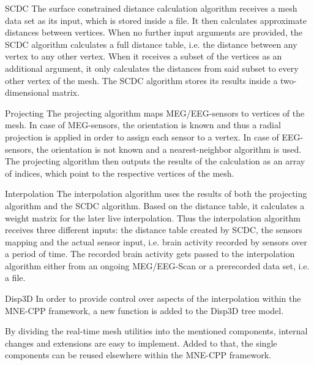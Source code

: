 \begin{aims}
	
	\item[SCDC] 
	The surface constrained distance calculation algorithm receives a mesh data set as its input, which is stored inside a file. It then calculates approximate distances between vertices. When no further input arguments are provided, the SCDC algorithm calculates a full distance table, i.e. the distance between any vertex to any other vertex.
	When it receives a subset of the vertices as an additional argument, it only calculates the distances from said subset to every other vertex of the mesh. The SCDC algorithm stores its results inside a two-dimensional matrix.
	
	\item[Projecting]
	The projecting algorithm maps MEG/EEG-sensors to vertices of the mesh. In case of MEG-sensors, the orientation is known and thus a radial projection is applied in order to assign each sensor to a vertex. In case of EEG-sensors, the orientation is not known and a nearest-neighbor algorithm is used.
	The projecting algorithm then outputs the results of the calculation as an array of indices, which point to the respective vertices of the mesh.
	
	\item[Interpolation]
	The interpolation algorithm uses the results of both the projecting algorithm and the SCDC algorithm.
	Based on the distance table, it calculates a weight matrix for the later live interpolation. 
	Thus the interpolation algorithm receives three different inputs: the distance table created by SCDC, the sensors mapping and the actual sensor input, i.e. brain activity recorded by sensors over a period of time.
	The recorded brain activity gets passed to the interpolation algorithm either from an ongoing MEG/EEG-Scan or a prerecorded data set, i.e. a file. 
	
	\item[Disp3D]
	In order to provide control over aspects of the interpolation within the MNE-CPP framework, a new function is added to the Disp3D tree model.
		
\end{aims}

By dividing the real-time mesh utilities into the mentioned components, internal changes and extensions are easy to implement. Added to that, the single components can be reused elsewhere within the MNE-CPP framework.

\clearpage

